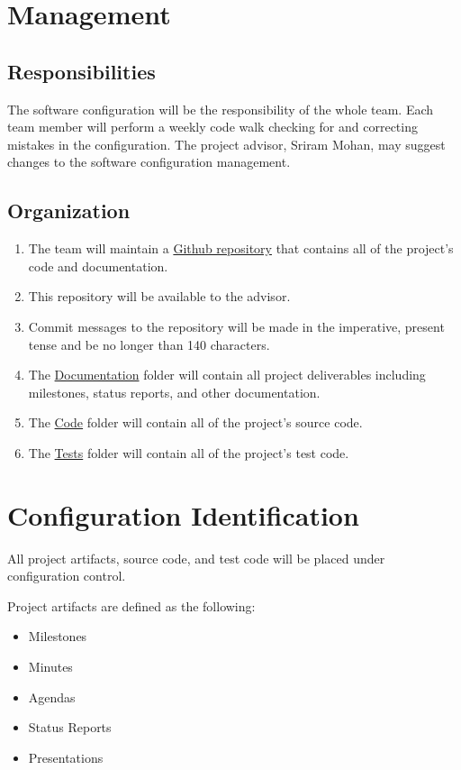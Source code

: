 \documentclass[12pt]{article}
\begin{document}
\section{Management}
\subsection{Responsibilities}
The software configuration will be the responsibility of the whole team. Each team member will perform a weekly code walk checking for and correcting mistakes in the configuration. The project advisor, Sriram Mohan, may suggest changes to the software configuration management.

\subsection{Organization}
\begin{enumerate}
\item The team will maintain a \href{https://github.com/mooremo/Settlers-of-Catan}{Github repository} that contains all of the project's code and documentation.
\item This repository will be available to the advisor.
\item Commit messages to the repository will be made in the imperative, present tense and be no longer than 140 characters.
\item The \href{https://github.com/mooremo/Settlers-of-Catan/tree/master/Documentation}{Documentation} folder will contain all project deliverables including milestones, status reports, and other documentation.
\item The \href{https://github.com/mooremo/Settlers-of-Catan/tree/master/Code/SettlersOfCatan}{Code} folder will contain all of the project's source code.
\item The \href{https://github.com/mooremo/Settlers-of-Catan/tree/master/Code/SettlersOfCatanTest}{Tests} folder will contain all of the project's test code.
\end{enumerate}

\section{Configuration Identification}
All project artifacts, source code, and test code will be placed under configuration control. 

Project artifacts are defined as the following:
\begin{itemize}
\item Milestones
\item Minutes
\item Agendas
\item Status Reports
\item Presentations
\end{itemize}
\end{document}

